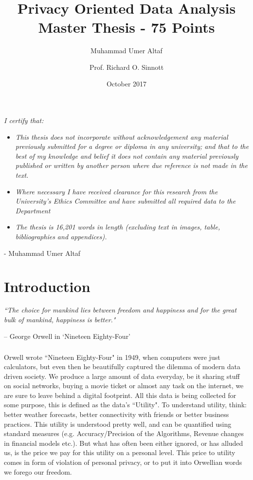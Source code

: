 \documentclass[12pt]{report}
\title{Privacy Oriented Data Analysis\\\large{Master Thesis - 75 Points}}
\author[1]{Muhammad Umer Altaf}
\author[1]{Prof. Richard O. Sinnott}
\affil[1]{The University of Melbourne\\School of Computing and Information Systems}
\date{October 2017}
\theoremstyle{named}
\begin{document}
\maketitle
\setcounter{tocdepth}{1}
\tableofcontents
\pagebreak

\textit{I certify that:}
\begin{itemize}
\item \textit{This thesis does not incorporate without acknowledgement any material previously submitted for a degree or diploma in any university; and that to the best of my knowledge and belief it does not contain any material
previously published or written by another person where due reference is not made in the text.}
\item \textit{Where necessary I have received clearance for this research from the University's Ethics Committee and have submitted all required data to the Department }
\item \textit{The thesis is 16,201 words in length (excluding text in images, table, bibliographies and appendices).}
\end{itemize}
- Muhammad Umer Altaf
\pagebreak
\thispagestyle{empty}
 
\listoffigures
 
\listoftables
 
\newpage

\chapter{Introduction}


\textit{``The choice for mankind lies between freedom and happiness and for the great bulk of mankind, happiness is better."}

{\raggedleft -- George Orwell in `Nineteen Eighty-Four'\quad\par}

\paragraph{}
Orwell wrote ``Nineteen Eighty-Four" in 1949, when computers were just calculators, but even then he beautifully captured the dilemma of modern data driven society. We produce a large amount of data everyday, be it sharing stuff on social networks, buying a movie ticket or almost any task on the internet, we are sure to leave behind a digital footprint. All this data is being collected for some purpose, this is defined as the data's ``Utility". To understand utility, think: better weather forecasts, better connectivity with friends or better business practices. This utility is understood pretty well, and can be quantified using standard measures (e.g. Accuracy/Precision of the Algorithms, Revenue changes in financial models etc.). But what has often been either ignored, or has alluded us, is the price we pay for this utility on a personal level. This price to utility comes in form of violation of personal privacy, or to put it into Orwellian words we forego our freedom.
\end{document}
